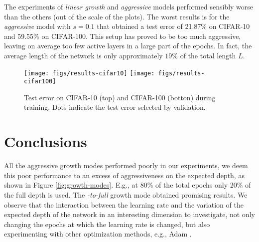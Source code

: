 \documentclass{sig-alternate}
\begin{document}
The experiments of \emph{linear growth} and \emph{aggressive} models performed sensibly worse than the others (out of the scale of the plots).
The worst results is for the \emph{aggressive} model with $s=0.1$ that obtained a test error of 21.87\% on CIFAR-10 and 59.55\% on CIFAR-100.
This setup has proved to be too much aggressive, leaving on average too few active layers in a large part of the epochs. 
In fact, the average length of the network is only approximately $19\%$ of the total length $L$.

\begin{figure*}[t!]
\begin{center}
\texttt{[image: figs/results-cifar10]}
\texttt{[image: figs/results-cifar100]}%
\end{center}
\label{fig:results10}
\vspace{-5ex}\caption{Test error on CIFAR-10 (top) and CIFAR-100 (botton) during training. Dots indicate the test error selected by validation.}
\end{figure*}

\section{Conclusions}
All the aggressive growth modes performed poorly in our experiments, we deem this poor performance to an excess of aggressiveness on the expected depth, as shown in Figure \ref{fig:growth-modes}. 
E.g., at 80\% of the total epochs only 20\% of the full depth is used.
The \emph{\cite{huang2016deep}-to-full} growth mode obtained promising results.
We observe that the interaction between the learning rate and the variation of the expected depth of the network in an interesting dimension to investigate, not only changing the epochs at which the learning rate is changed, but also experimenting with other optimization methods, e.g., Adam \cite{adam}.


\end{document}
